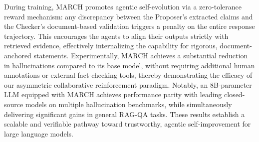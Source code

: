 \documentclass[10pt, a4paper, logo]{googledeepmind} %
\begin{document}
During training, MARCH promotes agentic self-evolution via a zero-tolerance reward mechanism: any discrepancy between the Proposer’s extracted claims and the Checker’s document-based validation triggers a penalty on the entire response trajectory. This encourages the agents to align their outputs strictly with retrieved evidence, effectively internalizing the capability for rigorous, document-anchored statements.
%
Experimentally, MARCH achieves a substantial reduction in hallucinations compared to its base model, without requiring additional human annotations or external fact-checking tools, thereby demonstrating the efficacy of our asymmetric collaborative reinforcement paradigm. Notably, an 8B-parameter LLM equipped with MARCH achieves performance parity with leading closed-source models on multiple hallucination benchmarks, while simultaneously delivering significant gains in general RAG-QA tasks. These results establish a scalable and verifiable pathway toward trustworthy, agentic self-improvement for large language models.

\end{document}
